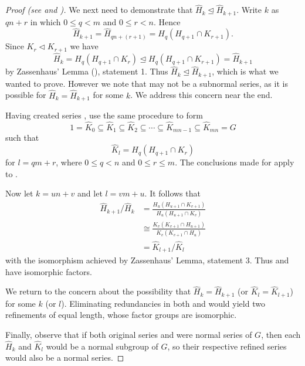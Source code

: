 \begin{proof}[Proof (see {\cite[\S 72]{clark_1984}} and \cite{proofwiki_schreier-zassenhaus})]
    We next need to demonstrate that $\hat{H}_k \unlhd \hat{H}_{k+1}$. Write $k$ as $qn+r$ in which $0 \leq q < m$ and $0 \leq r < n$. Hence
    \[
        \hat{H}_{k+1} = \hat{H}_{qn+(r+1)} = H_q(H_{q+1}\cap K_{r+1}). 
    \]
    Since $K_r \lhd K_{r+1}$ we have
    \[
        \hat{H}_k = H_q(H_{q+1}\cap K_r) \unlhd H_q(H_{q+1}\cap K_{r+1}) = \hat{H}_{k+1}
    \]
    by Zassenhaus' Lemma (), statement 1. Thus $\hat{H}_k \unlhd \hat{H}_{k+1}$, which is what we wanted to prove. However we note that  may not be a subnormal series, as it is possible for $\hat{H}_k = \hat{H}_{k+1}$ for some $k$. We address this concern near the end.
    
    Having created series , use the same procedure to form
    \begin{equation}\label{eqn:thrm-schreier-eqn-b-prime}
        1 = \hat{K}_0 \subseteq \hat{K}_1 \subseteq \hat{K}_2 \subseteq \cdots \subseteq \hat{K}_{mn - 1} \subseteq \hat{K}_{mn} = G
        \tag{B'}
    \end{equation}
    such that
    \[
        \hat{K}_l = H_q(H_{q+1}\cap K_r)
    \]
    for $l = qm + r$, where $0 \leq q < n$ and $0 \leq r \leq m$. The conclusions made for  apply to .
    
    Now let $k = un + v$ and let $l = vm + u$. It follows that
    \begin{align*}
        \hat{H}_{k+1}/\hat{H}_k &= \frac{H_u(H_{u+1}\cap K_{v+1})}{H_u(H_{u+1}\cap K_v)}\\
        &\cong \frac{K_v(K_{v+1}\cap H_{u+1})}{K_v(K_{v+1}\cap H_u)}\\
        &= \hat{K}_{l+1}/\hat{K}_l
    \end{align*}
    with the isomorphism achieved by Zassenhaus' Lemma, statement 3. Thus  and  have isomorphic factors.
    
    We return to the concern about the possibility that $\hat{H}_k = \hat{H}_{k+1}$ (or $\hat{K}_l = \hat{K}_{l+1}$) for some $k$ (or $l$). Eliminating redundancies in both  and  would yield two refinements of equal length, whose factor groups are isomorphic.
    
    Finally, observe that if both original series  and  were normal series of $G$, then each $\hat{H}_k$ and $\hat{K}_l$ would be a normal subgroup of $G$, so their respective refined series would also be a normal series.
\end{proof}

